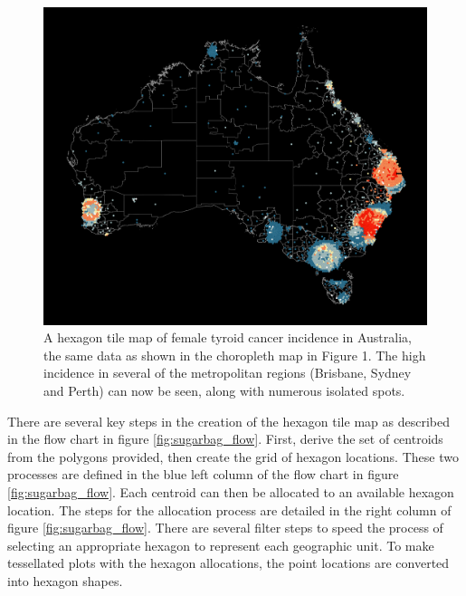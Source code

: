 \begin{Schunk}
\begin{figure}
\includegraphics[width=0.95\linewidth]{kobakian-cook_files/figure-latex/hexmap-1} \caption[A hexagon tile map of female tyroid cancer incidence in Australia, the same data as shown in the choropleth map in Figure 1]{A hexagon tile map of female tyroid cancer incidence in Australia, the same data as shown in the choropleth map in Figure 1. The high incidence in several of the metropolitan regions (Brisbane, Sydney and Perth) can now be seen, along with numerous isolated spots.}\label{fig:hexmap}
\end{figure}
\end{Schunk}

There are several key steps in the creation of the hexagon tile map as
described in the flow chart in figure \ref{fig:sugarbag_flow}. First,
derive the set of centroids from the polygons provided, then create the
grid of hexagon locations. These two processes are defined in the blue
left column of the flow chart in figure \ref{fig:sugarbag_flow}. Each
centroid can then be allocated to an available hexagon location. The
steps for the allocation process are detailed in the right column of
figure \ref{fig:sugarbag_flow}. There are several filter steps to speed
the process of selecting an appropriate hexagon to represent each
geographic unit. To make tessellated plots with the hexagon allocations,
the point locations are converted into hexagon shapes.

